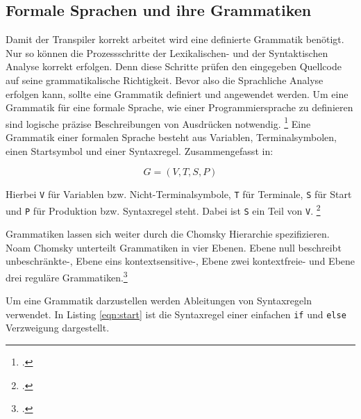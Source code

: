    
\subsection{Formale Sprachen und ihre Grammatiken}

Damit der Transpiler korrekt arbeitet wird eine definierte Grammatik benötigt. Nur so können die Prozessschritte der Lexikalischen- und der Syntaktischen Analyse korrekt erfolgen. Denn diese Schritte prüfen den eingegeben Quellcode auf seine grammatikalische Richtigkeit. Bevor also die Sprachliche Analyse erfolgen kann, sollte eine Grammatik definiert und angewendet werden. Um eine Grammatik für eine formale Sprache, wie einer Programmiersprache zu definieren sind logische präzise Beschreibungen von Ausdrücken notwendig. \footcite[Vgl. ][S. 149ff. ]{automata} 
Eine Grammatik einer formalen Sprache besteht aus Variablen, Terminalsymbolen, einen Startsymbol und einer Syntaxregel. Zusammengefasst in:

\begin{center}
\begin{equation}\label{eqn:grammar}
G=(V,T,S,P)
\end{equation}
\end{center}

Hierbei \verb+V+ für Variablen bzw. Nicht-Terminalsymbole, \verb+T+ für Terminale, \verb+S+ für Start und \verb+P+ für Produktion bzw. Syntaxregel steht. Dabei ist \verb+S+ ein Teil von \verb+V+.  \footcite[Vgl. ][S. 31ff. ]{automata}

Grammatiken lassen sich weiter durch die Chomsky Hierarchie spezifizieren. Noam Chomsky unterteilt Grammatiken in vier Ebenen. Ebene null beschreibt unbeschränkte-, Ebene eins kontextsensitive-, Ebene zwei kontextfreie- und Ebene drei reguläre Grammatiken.\footcite[Vgl. ][]{chomsky}

\pagebreak

Um eine Grammatik darzustellen werden Ableitungen von Syntaxregeln verwendet. In Listing \ref{eqn:start} ist die Syntaxregel einer einfachen \verb+if+ und \verb+else+ Verzweigung dargestellt.

